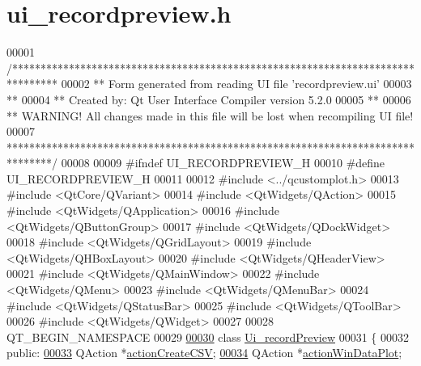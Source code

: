 \hypertarget{a00053_source}{\section{ui\+\_\+recordpreview.\+h}
\label{a00053_source}
}

\begin{DoxyCode}
00001 \textcolor{comment}{/********************************************************************************}
00002 \textcolor{comment}{** Form generated from reading UI file 'recordpreview.ui'}
00003 \textcolor{comment}{**}
00004 \textcolor{comment}{** Created by: Qt User Interface Compiler version 5.2.0}
00005 \textcolor{comment}{**}
00006 \textcolor{comment}{** WARNING! All changes made in this file will be lost when recompiling UI file!}
00007 \textcolor{comment}{********************************************************************************/}
00008 
00009 \textcolor{preprocessor}{#ifndef UI\_RECORDPREVIEW\_H}
00010 \textcolor{preprocessor}{#define UI\_RECORDPREVIEW\_H}
00011 
00012 \textcolor{preprocessor}{#include <../qcustomplot.h>}
00013 \textcolor{preprocessor}{#include <QtCore/QVariant>}
00014 \textcolor{preprocessor}{#include <QtWidgets/QAction>}
00015 \textcolor{preprocessor}{#include <QtWidgets/QApplication>}
00016 \textcolor{preprocessor}{#include <QtWidgets/QButtonGroup>}
00017 \textcolor{preprocessor}{#include <QtWidgets/QDockWidget>}
00018 \textcolor{preprocessor}{#include <QtWidgets/QGridLayout>}
00019 \textcolor{preprocessor}{#include <QtWidgets/QHBoxLayout>}
00020 \textcolor{preprocessor}{#include <QtWidgets/QHeaderView>}
00021 \textcolor{preprocessor}{#include <QtWidgets/QMainWindow>}
00022 \textcolor{preprocessor}{#include <QtWidgets/QMenu>}
00023 \textcolor{preprocessor}{#include <QtWidgets/QMenuBar>}
00024 \textcolor{preprocessor}{#include <QtWidgets/QStatusBar>}
00025 \textcolor{preprocessor}{#include <QtWidgets/QToolBar>}
00026 \textcolor{preprocessor}{#include <QtWidgets/QWidget>}
00027 
00028 QT\_BEGIN\_NAMESPACE
00029 
\hypertarget{a00053_source_l00030}{}\hyperlink{a00028}{00030} \textcolor{keyword}{class }\hyperlink{a00028}{Ui\_recordPreview}
00031 \{
00032 \textcolor{keyword}{public}:
\hypertarget{a00053_source_l00033}{}\hyperlink{a00028_ae81b7303db9e9c5d730c59b86ec0e960}{00033}     QAction *\hyperlink{a00028_ae81b7303db9e9c5d730c59b86ec0e960}{actionCreateCSV};
\hypertarget{a00053_source_l00034}{}\hyperlink{a00028_aa09067a9c96c9cd78f75261a9fcb89f0}{00034}     QAction *\hyperlink{a00028_aa09067a9c96c9cd78f75261a9fcb89f0}{actionWinDataPlot};

\end{DoxyCode}

